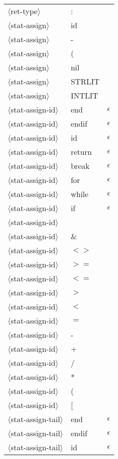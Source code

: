 \documentclass[11pt, fleqn]{article}
\newcommand{\atag}[1]{$\langle$#1$\rangle$}
\begin{document}
\begin{longtable}{l|l|l}
\atag{ret-type}					&	:		&		\\
\atag{stat-assign}				&	id		&			\\
\atag{stat-assign}				&	-		&			\\
\atag{stat-assign}				&	(		&			\\
\atag{stat-assign}				&	nil		&			\\
\atag{stat-assign}				&	STRLIT		&			\\
\atag{stat-assign}				&	INTLIT		&			\\
\atag{stat-assign-id}			&	end			&	$\epsilon$			\\
\atag{stat-assign-id}			&	endif		&	$\epsilon$			\\
\atag{stat-assign-id}			&	id			&	$\epsilon$			\\
\atag{stat-assign-id}			&	return		&	$\epsilon$			\\
\atag{stat-assign-id}			&	break		&	$\epsilon$			\\
\atag{stat-assign-id}			&	for			&	$\epsilon$			\\
\atag{stat-assign-id}			&	while		&	$\epsilon$			\\
\atag{stat-assign-id}			&	if			&	$\epsilon$			\\
\atag{stat-assign-id}			&	\textbar		&				\\
\atag{stat-assign-id}			&	\&			&				\\
\atag{stat-assign-id}			&	$<>$			&				\\
\atag{stat-assign-id}			&	$>=$			&				\\
\atag{stat-assign-id}			&	$<=$			&				\\
\atag{stat-assign-id}			&	$>$			&				\\
\atag{stat-assign-id}			&	$<$			&				\\
\atag{stat-assign-id}			&	$=$			&				\\
\atag{stat-assign-id}			&	-			&				\\
\atag{stat-assign-id}			&	+			&				\\
\atag{stat-assign-id}			&	/			&				\\
\atag{stat-assign-id}			&	*			&				\\
\atag{stat-assign-id}			&	(			&				\\
\atag{stat-assign-id}			&	[			&				\\
\atag{stat-assign-tail}			&	end			&	$\epsilon$	\\
\atag{stat-assign-tail}			&	endif			&	$\epsilon$	\\
\atag{stat-assign-tail}			&	id			&	$\epsilon$	\\

\end{longtable}
\end{document}
